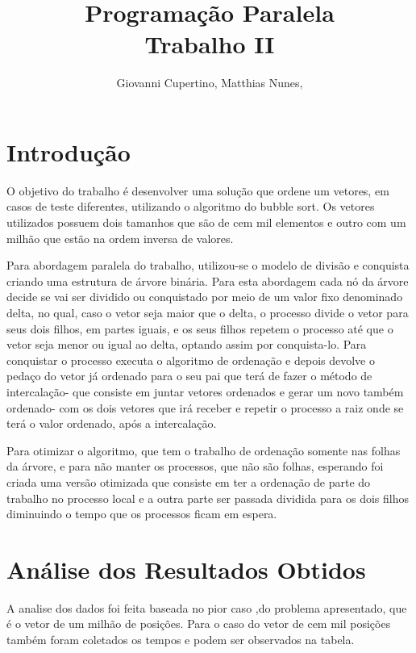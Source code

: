 \documentclass[11pt]{IEEEtran}
\title{Programação Paralela\\ Trabalho II}
\author{Giovanni Cupertino, Matthias Nunes, \IEEEmembership{Usuário pp12820}}
\begin{document}
\maketitle

\section{Introdução}

O objetivo do trabalho é desenvolver uma solução que ordene um vetores, em casos
de teste diferentes, utilizando o algoritmo do bubble sort. Os vetores
utilizados possuem dois tamanhos que são de cem mil elementos e outro com um
milhão que estão na ordem inversa de valores.

Para abordagem paralela do trabalho, utilizou-se o modelo de divisão e conquista
criando uma estrutura de árvore binária. Para esta abordagem cada nó da árvore
decide se vai ser dividido ou conquistado por meio de um valor fixo denominado
delta, no qual, caso o vetor seja maior que o delta, o processo divide o vetor
para seus dois filhos, em partes iguais, e os seus filhos repetem o processo até
que o vetor seja menor ou igual ao delta, optando assim por conquista-lo. Para
conquistar o processo executa o algoritmo de ordenação e depois devolve o pedaço
do vetor já ordenado para o seu pai que terá de fazer o método de intercalação-
que consiste em juntar vetores ordenados e gerar um novo também ordenado- com os
dois vetores que irá receber e repetir o processo a raiz onde se terá o valor
ordenado, após a intercalação.

Para otimizar o algoritmo, que tem o trabalho de ordenação somente nas folhas da
árvore, e para não manter os processos, que não são folhas, esperando foi criada
uma versão otimizada que consiste em ter a ordenação de parte do trabalho no
processo local e a outra parte ser passada dividida para os dois filhos
diminuindo o tempo que os processos ficam em espera.

\section{Análise dos Resultados Obtidos}

A analise dos dados foi feita baseada no pior caso ,do problema apresentado, que
é o vetor de um milhão de posições. Para o caso do vetor de cem mil posições
também foram coletados os tempos e podem ser observados na tabela.
\end{document}
